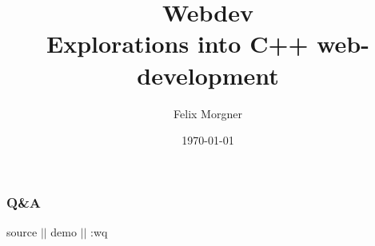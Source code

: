 \documentclass{beamer}
\title{{\Huge Webdev}\\Explorations into C++ web-development}
\author{Felix Morgner}
\institute{Computer Science\\Hochschule für Technik Rapperswil}
\date{\today}
\begin{document}
  \frame{\titlepage}

  \section[Agenda]{}

  \frame{
    \setcounter{tocdepth}{1}
    \tableofcontents
  }

  
  
  
  

  \frame
  {
    \frametitle{Q\&A}

    \begin{center}
      \huge source $||$ demo $||$ :wq
    \end{center}

  }

  
\end{document}
